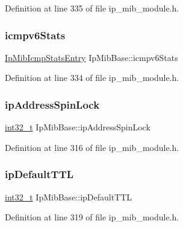 Definition at line 335 of file ip\+\_\+mib\+\_\+module.\+h.

\mbox{\label{structIpMibBase_a4d409d848258185928ffff00820a75f5}} 
\subsubsection{\texorpdfstring{icmpv6\+Stats}{icmpv6Stats}}
{\footnotesize\ttfamily \hyperlink{structIpMibIcmpStatsEntry}{Ip\+Mib\+Icmp\+Stats\+Entry} Ip\+Mib\+Base\+::icmpv6\+Stats}



Definition at line 334 of file ip\+\_\+mib\+\_\+module.\+h.

\mbox{\label{structIpMibBase_a9e5af99b95d976bdc15b274de5699dcf}} 
\subsubsection{\texorpdfstring{ip\+Address\+Spin\+Lock}{ipAddressSpinLock}}
{\footnotesize\ttfamily \hyperlink{stdint_8h_ab1967d8591af1a4e48c37fd2b0f184d0}{int32\+\_\+t} Ip\+Mib\+Base\+::ip\+Address\+Spin\+Lock}



Definition at line 316 of file ip\+\_\+mib\+\_\+module.\+h.

\mbox{\label{structIpMibBase_a6907839b2109d1d70c3b71b1b5a31c65}} 
\subsubsection{\texorpdfstring{ip\+Default\+T\+TL}{ipDefaultTTL}}
{\footnotesize\ttfamily \hyperlink{stdint_8h_ab1967d8591af1a4e48c37fd2b0f184d0}{int32\+\_\+t} Ip\+Mib\+Base\+::ip\+Default\+T\+TL}



Definition at line 319 of file ip\+\_\+mib\+\_\+module.\+h.

\mbox{\label{structIpMibBase_adcaa825f157134afdd9a9786a681321d}} 
